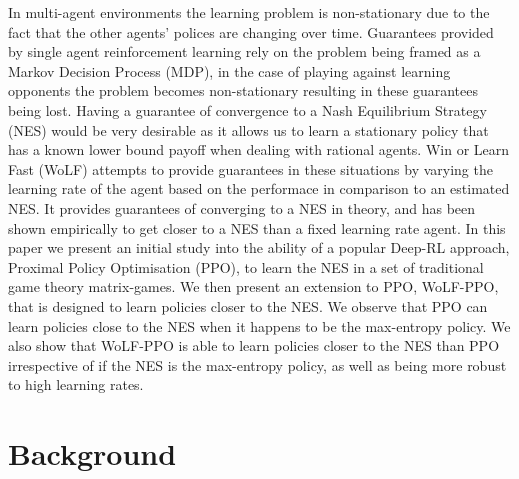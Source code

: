 \documentclass[conference]{IEEEtran}
\newcommand\REVIEW[1]{{\color{blue} #1}}
\begin{document}
In multi-agent environments the learning problem is non-stationary due to the fact that the other agents' polices are changing over time.
\REVIEW{Guarantees provided by single agent reinforcement learning rely on the problem being framed as a Markov Decision Process (MDP), in the case of playing against learning opponents the problem becomes non-stationary resulting in these guarantees being lost. Having a guarantee of convergence to a Nash Equilibrium Strategy (NES) would be very desirable as it allows us to learn a stationary policy that has a known lower bound payoff when dealing with rational agents.}
Win or Learn Fast (WoLF) attempts to provide guarantees in these situations\cite{bowling2002multiagent} by varying the learning rate of the agent based on the performace in comparison to an estimated NES. It provides guarantees of converging to a NES in theory, and has been shown empirically to get closer to a NES than a fixed learning rate agent. In this paper we present an initial study into the ability of a popular Deep-RL approach, Proximal Policy Optimisation (PPO), to learn the NES in a set of traditional game theory matrix-games. We then present an extension to PPO, WoLF-PPO, that is designed to learn policies closer to the NES. We observe that PPO can learn policies close to the NES when it happens to be the max-entropy policy. We also show that WoLF-PPO is able to learn policies closer to the NES than PPO irrespective of if the NES is the max-entropy policy, as well as being more robust to high learning rates.

\section{Background}


\end{document}

